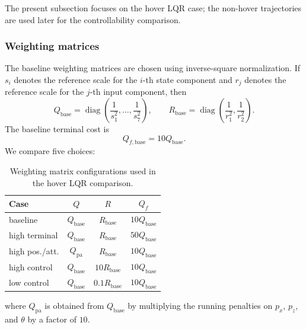 The present subsection focuses on the hover LQR case; the non-hover trajectories are used later for the controllability comparison.

\subsubsection{Weighting matrices}

The baseline weighting matrices are chosen using inverse-square normalization. If \(s_i\) denotes the reference scale for the \(i\)-th state component and \(r_j\) denotes the reference scale for the \(j\)-th input component, then
\[
    Q_{\mathrm{base}}
    =
    \operatorname{diag}\left(\frac{1}{s_1^2},\ldots,\frac{1}{s_7^2}\right),
    \qquad
    R_{\mathrm{base}}
    =
    \operatorname{diag}\left(\frac{1}{r_1^2},\frac{1}{r_2^2}\right).
\]
The baseline terminal cost is
\[
    Q_{f,\mathrm{base}} = 10Q_{\mathrm{base}}.
\]
We compare five choices:
\begin{table}[htbp]
\centering
\scriptsize
\begin{tabular}{lccc}
\hline
Case & $Q$ & $R$ & $Q_f$ \\
\hline
baseline & $Q_{\mathrm{base}}$ & $R_{\mathrm{base}}$ & $10Q_{\mathrm{base}}$ \\
high terminal & $Q_{\mathrm{base}}$ & $R_{\mathrm{base}}$ & $50Q_{\mathrm{base}}$ \\
high pos./att. & $Q_{\mathrm{pa}}$ & $R_{\mathrm{base}}$ & $10Q_{\mathrm{base}}$ \\
high control & $Q_{\mathrm{base}}$ & $10R_{\mathrm{base}}$ & $10Q_{\mathrm{base}}$ \\
low control & $Q_{\mathrm{base}}$ & $0.1R_{\mathrm{base}}$ & $10Q_{\mathrm{base}}$ \\
\hline
\end{tabular}
\caption{Weighting matrix configurations used in the hover LQR comparison.}
\label{tab:hover-lqr-weights}
\end{table}
where \(Q_{\mathrm{pa}}\) is obtained from \(Q_{\mathrm{base}}\) by multiplying the running penalties on \(p_x\), \(p_z\), and \(\theta\) by a factor of \(10\).

